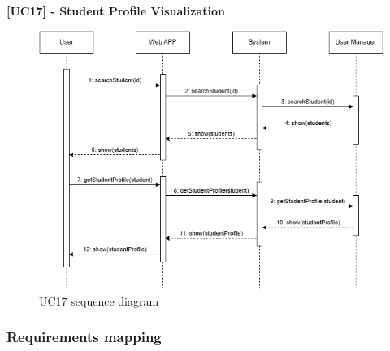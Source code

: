 \newpage

\textbf{[UC17] - Student Profile Visualization}
\begin{figure}[H]
    \centering
    \includegraphics[width=1\linewidth]{Images/SD_StudentProfile.png}
    \caption{UC17 sequence diagram}
    \label{fig:uc17}
\end{figure}

\newpage

\subsubsection{Requirements mapping}

